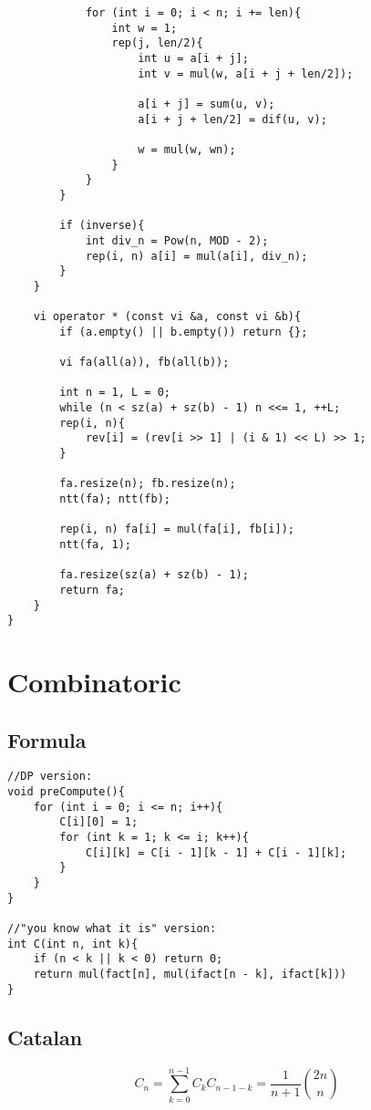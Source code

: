 \documentclass[11pt,a4paper]{article}
\begin{document}
\begin{multicols*}{2}
\begin{lstlisting}
            for (int i = 0; i < n; i += len){
                int w = 1;
                rep(j, len/2){
                    int u = a[i + j];
                    int v = mul(w, a[i + j + len/2]);

                    a[i + j] = sum(u, v);
                    a[i + j + len/2] = dif(u, v);

                    w = mul(w, wn);
                }
            }
        }

        if (inverse){
            int div_n = Pow(n, MOD - 2);
            rep(i, n) a[i] = mul(a[i], div_n);
        }
    }

    vi operator * (const vi &a, const vi &b){
        if (a.empty() || b.empty()) return {};

        vi fa(all(a)), fb(all(b));

        int n = 1, L = 0;
        while (n < sz(a) + sz(b) - 1) n <<= 1, ++L;
        rep(i, n){
            rev[i] = (rev[i >> 1] | (i & 1) << L) >> 1;
        }

        fa.resize(n); fb.resize(n);
        ntt(fa); ntt(fb);

        rep(i, n) fa[i] = mul(fa[i], fb[i]);
        ntt(fa, 1);

        fa.resize(sz(a) + sz(b) - 1);
        return fa;
    }
}
\end{lstlisting}

\section{Combinatoric}
\subsection{Formula}
\begin{lstlisting}
//DP version:
void preCompute(){
    for (int i = 0; i <= n; i++){
        C[i][0] = 1;
        for (int k = 1; k <= i; k++){
            C[i][k] = C[i - 1][k - 1] + C[i - 1][k];
        }
    }
}

//"you know what it is" version:
int C(int n, int k){
    if (n < k || k < 0) return 0;
    return mul(fact[n], mul(ifact[n - k], ifact[k])) 
}
\end{lstlisting}

\subsection{Catalan}
\[
C_n = \sum_{k=0}^{n-1} C_k C_{n-1-k} 
    = \frac{1}{n+1} \binom{2n}{n}
\]


\end{multicols*}
\end{document}
